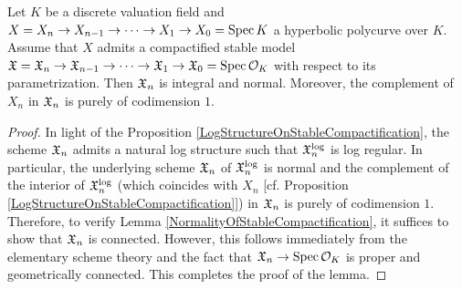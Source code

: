 \begin{lem}\label{NormalityOfStableCompactification}
  Let $K$ be a discrete valuation field and $X = X_n \to X_{n - 1} \to \cdots \to X_1 \to X_0 = \mathrm{Spec} \, K$ a hyperbolic polycurve over $K$. Assume that $X$ admits a compactified stable model $\mathfrak{X} = \mathfrak{X}_n \to \mathfrak{X}_{n - 1} \to \cdots \to \mathfrak{X}_1 \to \mathfrak{X}_0 = \mathrm{Spec} \, \mathcal{O}_K$ with respect to its parametrization. Then $\mathfrak{X}_n$ is integral and normal. Moreover, the complement of $X_n$ in $\mathfrak{X}_n$ is purely of codimension $1$.
\end{lem}
\begin{proof}
  In light of the Proposition \ref{LogStructureOnStableCompactification}, the scheme $\mathfrak{X}_n$ admits a natural log structure such that $\mathfrak{X}_n^{\mathrm{log}}$ is log regular. In particular, the underlying scheme $\mathfrak{X}_n$ of $\mathfrak{X}_n^{\mathrm{log}}$ is normal and the complement of the interior of $\mathfrak{X}_n^{\mathrm{log}}$ (which coincides with $X_n$ [cf. Proposition \ref{LogStructureOnStableCompactification}]) in $\mathfrak{X}_n$ is purely of codimension $1$. Therefore, to verify Lemma \ref{NormalityOfStableCompactification}, it suffices to show that $\mathfrak{X}_n$ is connected. However, this follows immediately from the elementary scheme theory and the fact that $\mathfrak{X}_n \to \mathrm{Spec} \, \mathcal{O}_K$ is proper and geometrically connected. This completes the proof of the lemma.
\end{proof}


